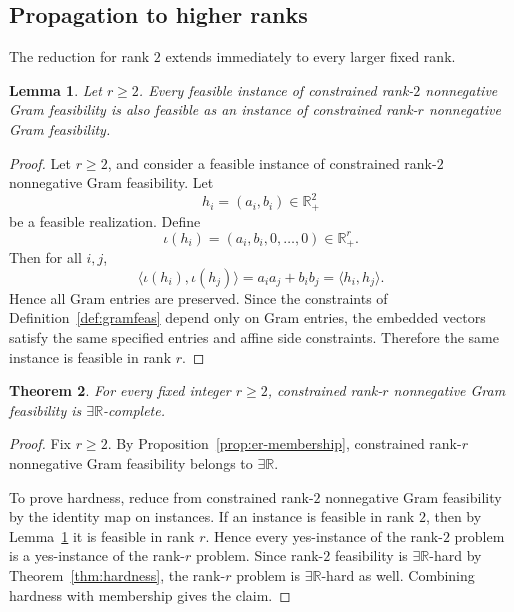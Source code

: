 \documentclass[11pt]{article}
\newtheorem{theorem}{Theorem}[section]
\newtheorem{lemma}[theorem]{Lemma}
\begin{document}
\subsection{Propagation to higher ranks}

The reduction for rank \(2\) extends immediately to every larger fixed rank.

\begin{lemma}
\label{lem:rank-lift}
Let \(r\ge 2\). Every feasible instance of constrained rank-$2$
nonnegative Gram feasibility is also feasible as an instance of
constrained rank-$r$ nonnegative Gram feasibility.
\end{lemma}

\begin{proof}
Let \(r\ge 2\), and consider a feasible instance of constrained rank-$2$
nonnegative Gram feasibility. Let
\[
h_i=(a_i,b_i)\in\mathbb{R}_+^2
\]
be a feasible realization. Define
\[
\iota(h_i)=(a_i,b_i,0,\dots,0)\in\mathbb{R}_+^r.
\]
Then for all \(i,j\),
\[
\langle \iota(h_i),\iota(h_j)\rangle
=
a_i a_j+b_i b_j
=
\langle h_i,h_j\rangle.
\]
Hence all Gram entries are preserved. Since the constraints of
Definition~\ref{def:gramfeas} depend only on Gram entries, the embedded
vectors satisfy the same specified entries and affine side constraints.
Therefore the same instance is feasible in rank \(r\).
\end{proof}

\begin{theorem}
\label{thm:classification-fixed-r}
For every fixed integer \(r\ge 2\), constrained rank-$r$ nonnegative Gram
feasibility is \(\exists\mathbb{R}\)-complete.
\end{theorem}

\begin{proof}
Fix \(r\ge 2\). By Proposition~\ref{prop:er-membership}, constrained
rank-$r$ nonnegative Gram feasibility belongs to \(\exists\mathbb{R}\).

To prove hardness, reduce from constrained rank-$2$ nonnegative Gram
feasibility by the identity map on instances. If an instance is feasible
in rank \(2\), then by Lemma~\ref{lem:rank-lift} it is feasible in rank \(r\).
Hence every yes-instance of the rank-$2$ problem is a yes-instance of the
rank-$r$ problem. Since rank-$2$ feasibility is \(\exists\mathbb{R}\)-hard
by Theorem~\ref{thm:hardness}, the rank-$r$ problem is
\(\exists\mathbb{R}\)-hard as well. Combining hardness with membership gives
the claim.
\end{proof}
\end{document}
